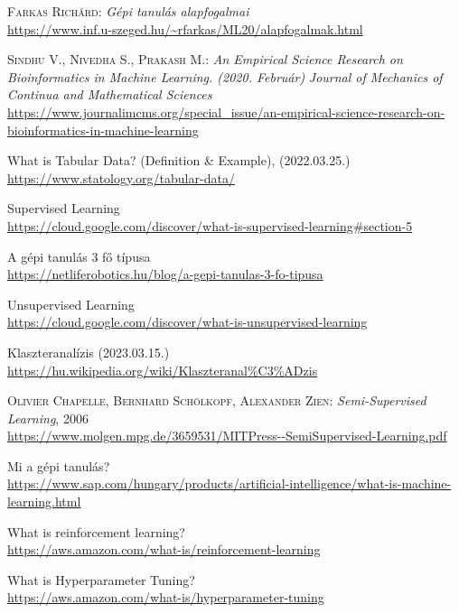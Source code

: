 \documentclass[
]{thesis-ekf}
\theoremstyle{definition}
\theoremstyle{remark}
\begin{document}
\begin{thebibliography}{2}
\textsc{Farkas Richárd}: \emph{Gépi tanulás alapfogalmai}
\\\url{https://www.inf.u-szeged.hu/~rfarkas/ML20/alapfogalmak.html}

\textsc{Sindhu V., Nivedha S., Prakash M.}: \emph{An Empirical Science Research on Bioinformatics in Machine Learning. (2020. Február)} \textit{Journal of Mechanics of Continua and Mathematical Sciences}
\\\url{https://www.journalimcms.org/special_issue/an-empirical-science-research-on-bioinformatics-in-machine-learning}

What is Tabular Data? (Definition \& Example), (2022.03.25.)
\\\url{https://www.statology.org/tabular-data/}

Supervised Learning
\\\url{https://cloud.google.com/discover/what-is-supervised-learning#section-5}

A gépi tanulás 3 fő típusa
\\\url{https://netliferobotics.hu/blog/a-gepi-tanulas-3-fo-tipusa}

Unsupervised Learning
\\\url{https://cloud.google.com/discover/what-is-unsupervised-learning}

Klaszteranalízis (2023.03.15.)
\\\url{https://hu.wikipedia.org/wiki/Klaszteranal%C3%ADzis}

\textsc{Olivier Chapelle, Bernhard Schölkopf, Alexander Zien}: \emph{Semi-Supervised Learning}, 2006
\\\url{https://www.molgen.mpg.de/3659531/MITPress--SemiSupervised-Learning.pdf}

Mi a gépi tanulás?
\\\url{https://www.sap.com/hungary/products/artificial-intelligence/what-is-machine-learning.html}

What is reinforcement learning?
\\\url{https://aws.amazon.com/what-is/reinforcement-learning}

What is Hyperparameter Tuning?
\\\url{https://aws.amazon.com/what-is/hyperparameter-tuning}


\end{thebibliography}
\end{document}
